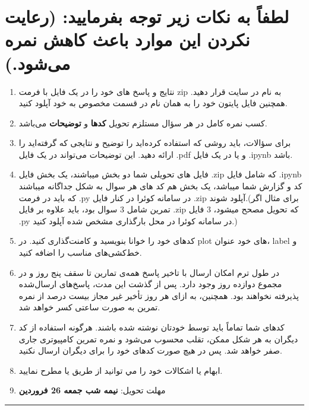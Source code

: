 \documentclass[a4paper]{article}
\begin{document}
\section*{
لطفاً به نکات زیر توجه بفرمایید: (رعایت نکردن این موارد باعث کاهش نمره می‌شود.)
}
\begin{enumerate}
	\item 
نتایج و پاسخ های خود را در یک فایل با فرمت zip به نام
 در سایت  
\href{https://quera.org/overview/add_to_course/course/10631}{} 
 قرار دهید. همچنین فایل پایتون خود را به همان نام در قسمت مخصوص به خود آپلود کنید.
	\item 
کسب نمره کامل در هر سؤال مستلزم تحویل  \textbf{کدها} و \textbf{توضیحات} می‌باشد. 
\item 
برای سؤالات، باید روشی که استفاده کرده‌اید را توضیح  و نتایجی که گرفته‌اید را ارائه دهید. این توضیحات می‌تواند در یک فایل  .pdf  و یا در یک فایل  .ipynb باشد. 
\item
فایل های تحویلی شما دو بخش میباشند، یک بخش فایل .zip که شامل فایل .ipynb کد و گزارش شما میباشد، یک بخش هم کد های هر سوال به شکل جداگانه میباشند که باید در فرمت .py در سامانه کوئرا در کنار فایل .zip آپلود شوند.(برای مثال اگر تمرین شامل 3 سوال بود، باید علاوه بر فایل .zip که تحویل مصحح میشود، 3 فایل .py در سامانه کوئرا در محل بارگذاری مشخص شده آپلود کنید.)
\item 
کدهای خود را خوانا بنویسید و کامنت‌‌گذاری کنید. در plot های خود عنوان، label و خط‌کشی‌های مناسب را اضافه کنید.
\item
در طول ترم امکان ارسال با تاخیر پاسخ  همه‌ی تمارین تا سقف پنج روز و در مجموع دوازده روز وجود دارد. پس از گذشت این مدت، پاسخ‌های ارسال‌شده پذیرفته نخواهند بود. همچنین، به ازای هر روز تأخیر غیر مجاز  بیست درصد از نمره تمرین به صورت ساعتی کسر خواهد شد.
\item
کدهای شما تماماً باید توسط خودتان نوشته شده باشند. هرگونه استفاده از کد دیگران به هر شکل ممکن، تقلب محسوب می‌شود و نمره تمرین کامپیوتری جاری صفر خواهد شد. پس در هیچ صورت کدهای خود را برای دیگران ارسال نکنید.
\item 
ابهام يا اشكالات خود را مي توانيد  از طریق
\href{mailto:smmzdr@gmail.com}{}
یا 
\href{mailto:javadiamirhosein.2000@gmail.com}{}
مطرح نماييد.
\item 
مهلت تحویل:  
\textbf{نیمه شب جمعه 26 فروردین}
\end{enumerate}
\rule[0.1\baselineskip]{\textwidth}{1.5pt}

\clearpage
\end{document}
